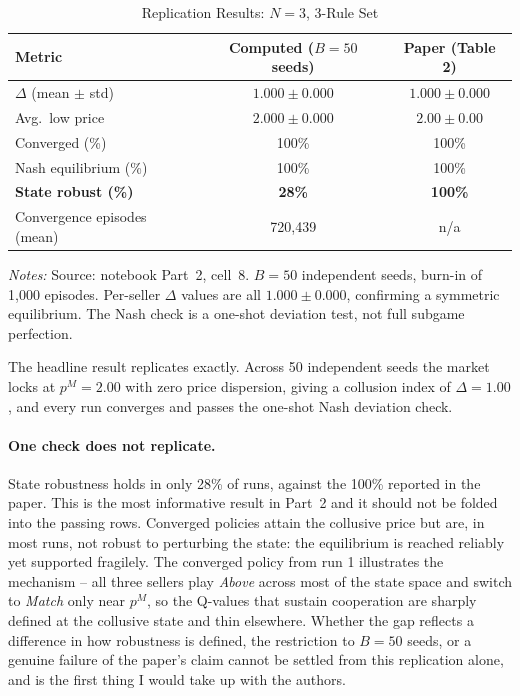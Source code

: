 \documentclass[11pt]{article}
\begin{document}
\begin{table}[htbp]
  \centering
  \caption{Replication Results: $N = 3$, 3-Rule Set}
  \label{tab:replication}
  \small
  \begin{tabular}{lcc}
    \toprule
    Metric & Computed ($B = 50$ seeds) & Paper (Table 2) \\
    \midrule
    $\Delta$ (mean $\pm$ std)      & $1.000 \pm 0.000$ & $1.000 \pm 0.000$ \\
    Avg.\ low price                & $2.000 \pm 0.000$ & $2.00 \pm 0.00$ \\
    Converged (\%)                 & 100\% & 100\% \\
    Nash equilibrium (\%)          & 100\% & 100\% \\
    \textbf{State robust (\%)}     & \textbf{28\%} & \textbf{100\%} \\
    Convergence episodes (mean)    & 720,439 & n/a \\
    \bottomrule
  \end{tabular}
  \vspace{0.6ex}
  \begin{minipage}{0.9\textwidth}
  \footnotesize \textit{Notes:} Source: notebook Part~2, cell~8. $B = 50$
  independent seeds, burn-in of 1,000 episodes. Per-seller $\Delta$ values are
  all $1.000 \pm 0.000$, confirming a symmetric equilibrium. The Nash check is a
  one-shot deviation test, not full subgame perfection.
  \end{minipage}
\end{table}

The headline result replicates exactly. Across 50 independent seeds the market
locks at $p^M = 2.00$ with zero price dispersion, giving a collusion index of
$\Delta = 1.00$, and every run converges and passes the one-shot Nash
deviation check.

\paragraph{One check does not replicate.} State robustness holds in only 28\% of
runs, against the 100\% reported in the paper. This is the most informative
result in Part~2 and it should not be folded into the passing rows. Converged
policies attain the collusive price but are, in most runs, not robust to
perturbing the state: the equilibrium is reached reliably yet supported
fragilely. The converged policy from run 1 illustrates the mechanism -- all three
sellers play \emph{Above} across most of the state space and switch to
\emph{Match} only near $p^M$, so the Q-values that sustain cooperation are
sharply defined at the collusive state and thin elsewhere. Whether the gap
reflects a difference in how robustness is defined, the restriction to $B = 50$
seeds, or a genuine failure of the paper's claim cannot be settled from this
replication alone, and is the first thing I would take up with the authors.
\end{document}
